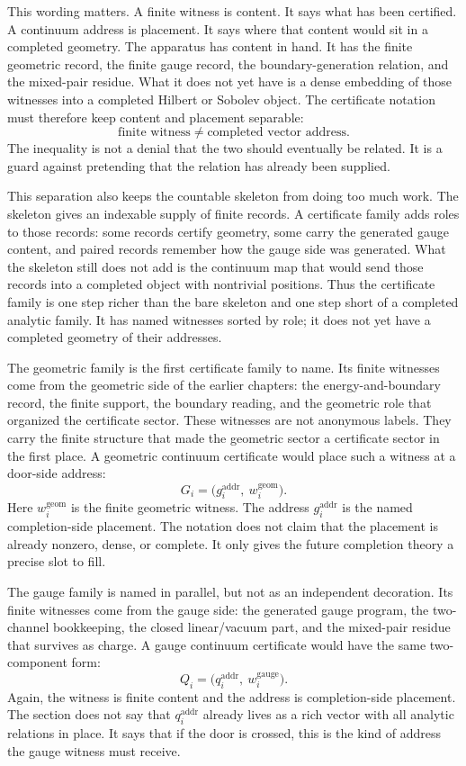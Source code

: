 This wording matters. A finite witness is content. It says what has been
certified. A continuum address is placement. It says where that content would
sit in a completed geometry. The apparatus has content in hand. It has the
finite geometric record, the finite gauge record, the boundary-generation
relation, and the mixed-pair residue. What it does not yet have is a dense
embedding of those witnesses into a completed Hilbert or Sobolev object. The
certificate notation must therefore keep content and placement separable:
\[
  \text{finite witness} \neq \text{completed vector address}.
\]
The inequality is not a denial that the two should eventually be related. It
is a guard against pretending that the relation has already been supplied.

This separation also keeps the countable skeleton from doing too much work.
The skeleton gives an indexable supply of finite records. A certificate family
adds roles to those records: some records certify geometry, some carry the
generated gauge content, and paired records remember how the gauge side was
generated. What the skeleton still does not add is the continuum map that would
send those records into a completed object with nontrivial positions. Thus the
certificate family is one step richer than the bare skeleton and one step short
of a completed analytic family. It has named witnesses sorted by role; it does
not yet have a completed geometry of their addresses.

The geometric family is the first certificate family to name. Its finite
witnesses come from the geometric side of the earlier chapters: the
energy-and-boundary record, the finite support, the boundary reading, and the
geometric role that organized the certificate sector. These witnesses are not
anonymous labels. They carry the finite structure that made the geometric
sector a certificate sector in the first place. A geometric continuum
certificate would place such a witness at a door-side address:
\[
  G_i = \big(g_i^{\mathrm{addr}},\ w_i^{\mathrm{geom}}\big).
\]
Here \(w_i^{\mathrm{geom}}\) is the finite geometric witness. The address
\(g_i^{\mathrm{addr}}\) is the named completion-side placement. The notation
does not claim that the placement is already nonzero, dense, or complete. It
only gives the future completion theory a precise slot to fill.

The gauge family is named in parallel, but not as an independent decoration.
Its finite witnesses come from the gauge side: the generated gauge program, the
two-channel bookkeeping, the closed linear/vacuum part, and the mixed-pair
residue that survives as charge. A gauge continuum certificate would have the
same two-component form:
\[
  Q_i = \big(q_i^{\mathrm{addr}},\ w_i^{\mathrm{gauge}}\big).
\]
Again, the witness is finite content and the address is completion-side
placement. The section does not say that \(q_i^{\mathrm{addr}}\) already lives
as a rich vector with all analytic relations in place. It says that if the
door is crossed, this is the kind of address the gauge witness must receive.

